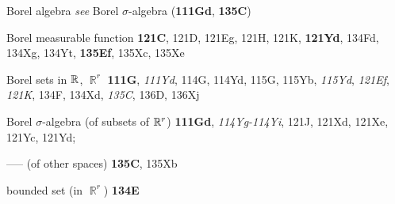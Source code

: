 Borel algebra {\it see} Borel $\sigma$-algebra ({\bf 111Gd},
{\bf 135C}) 























Borel measurable function {\bf 121C}, 121D, 121Eg, 121H, 121K, {\bf 121Yd}, 134Fd, 134Xg, 134Yt,
{\bf 135Ef}, 135Xc, 135Xe







Borel sets in $\Bbb R$, $\BbbR^r$ {\bf 111G}, {\it 111Yd}, 114G, 114Yd,
115G, 115Yb, {\it 115Yd}, {\it 121Ef}, {\it 121K}, 134F, 134Xd,
{\it 135C}, 136D, 136Xj






Borel $\sigma$-algebra (of subsets of $\Bbb R^r$) {\bf 111Gd},
{\it 114Yg-114Yi}, 
121J, 121Xd, 121Xe, 121Yc, 121Yd;

----- (of other spaces) {\bf 135C}, 135Xb











bounded set (in $\BbbR^r$) {\bf 134E}




















































